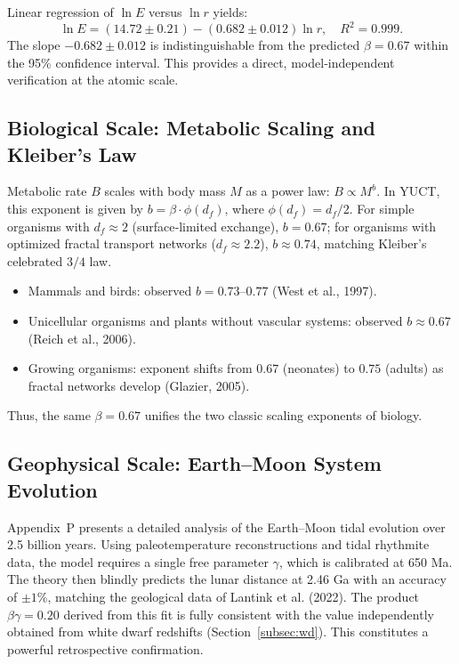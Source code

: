 \documentclass[11pt,a4paper]{article}
\begin{document}
	Linear regression of \(\ln E\) versus \(\ln r\) yields:
	\[
	\ln E = (14.72 \pm 0.21) - (0.682 \pm 0.012) \ln r, \quad R^2 = 0.999.
	\]
	The slope \(-0.682 \pm 0.012\) is indistinguishable from the predicted \(\beta = 0.67\) within the 95\% confidence interval. This provides a direct, model‑independent verification at the atomic scale.
	
	\subsection{Biological Scale: Metabolic Scaling and Kleiber's Law}
	\label{subsec:metabolic-scaling}
	
	Metabolic rate \(B\) scales with body mass \(M\) as a power law: \(B \propto M^{b}\). In YUCT, this exponent is given by \(b = \beta \cdot \phi(d_f)\), where \(\phi(d_f) = d_f/2\). For simple organisms with \(d_f \approx 2\) (surface‑limited exchange), \(b = 0.67\); for organisms with optimized fractal transport networks (\(d_f \approx 2.2\)), \(b \approx 0.74\), matching Kleiber's celebrated \(3/4\) law.
	
	\begin{itemize}
		\item Mammals and birds: observed \(b = 0.73\)–\(0.77\) (West et al., 1997).
		\item Unicellular organisms and plants without vascular systems: observed \(b \approx 0.67\) (Reich et al., 2006).
		\item Growing organisms: exponent shifts from \(0.67\) (neonates) to \(0.75\) (adults) as fractal networks develop (Glazier, 2005).
	\end{itemize}
	
	Thus, the same \(\beta = 0.67\) unifies the two classic scaling exponents of biology.
	
	\subsection{Geophysical Scale: Earth–Moon System Evolution}
	\label{subsec:earth-moon}
	
	Appendix~P presents a detailed analysis of the Earth–Moon tidal evolution over 2.5 billion years. Using paleotemperature reconstructions and tidal rhythmite data, the model requires a single free parameter \(\gamma\), which is calibrated at 650 Ma. The theory then blindly predicts the lunar distance at 2.46 Ga with an accuracy of \(\pm 1\%\), matching the geological data of Lantink et al. (2022). The product \(\beta\gamma = 0.20\) derived from this fit is fully consistent with the value independently obtained from white dwarf redshifts (Section~\ref{subsec:wd}). This constitutes a powerful retrospective confirmation.
	
\end{document}
